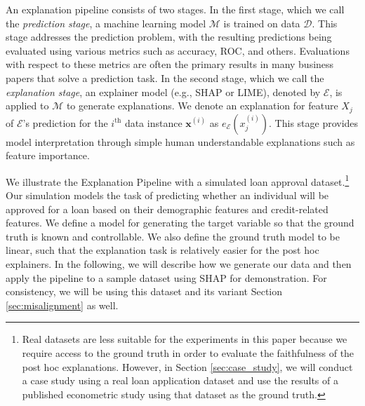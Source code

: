 \documentclass[mnsc,blindrev]{informs3}
\begin{document}
An explanation pipeline consists of two stages. In the first stage, which we call the \emph{prediction stage}, a machine learning model $\mathcal{M}$ is trained on data $\mathcal{D}$. This stage addresses the prediction problem, with the resulting predictions being evaluated using various metrics such as accuracy, ROC, and others. Evaluations with respect to these metrics are often the primary results in many business papers that solve a prediction task. In the second stage, which we call the \emph{explanation stage}, an explainer model (e.g., SHAP or LIME), denoted by $\mathcal{E}$, is applied to $\mathcal{M}$ to generate explanations. We denote an explanation for feature $X_j$ of $\mathcal{E}$'s prediction for the $i^{\text{th}}$ data instance $\mathbf{x}^{(i)}$ as $e_{\mathcal{E}}(x^{(i)}_j)$. This stage provides model interpretation through simple human understandable explanations such as feature importance. %
    
    We illustrate the Explanation Pipeline with a simulated loan approval dataset.\footnote{Real datasets are less suitable for the experiments in this paper because we require access to the ground truth in order to evaluate the faithfulness of the post hoc explanations. However, in Section \ref{sec:case_study}, we will conduct a case study using a real loan application dataset and use the results of a published econometric study using that dataset as the ground truth.} Our simulation models the task of predicting whether an individual will be approved for a loan based on their demographic features and credit-related features. We define a model for generating the target variable so that the ground truth is known and controllable. We also define the ground truth model to be linear, such that the explanation task is relatively easier for the post hoc explainers. %
    In the following, we will describe how we generate our data and then apply the pipeline to a sample dataset using SHAP for demonstration. For consistency, we will be using this dataset and its variant Section \ref{sec:misalignment} as well. %
\end{document}
